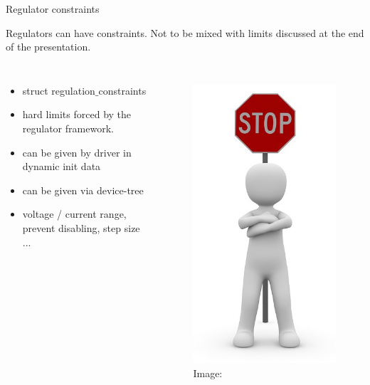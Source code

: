 \documentclass[aspectratio=169]{beamer}
\begin{document}
\begin{frame}[t]{Regulator constraints}\vspace{4pt} 
\begin{block}{Regulators can have constraints.}
Not to be mixed with limits discussed at the end of the presentation.
\end{block}
\par
\begin{columns}
\begin{itemize}
	\item struct regulation$\_$constraints 
	\item hard limits forced by the regulator framework.
	\item can be given by driver in dynamic init data
	\item can be given via device-tree
	\item voltage / current range, prevent disabling, step size ...
\end{itemize}
\begin{figure}
\includegraphics[height=0.55\textheight]{image_dl/stopman.jpg}
\scriptsize Image: 
\end{figure}
\end{columns}
\end{frame}
\end{document}
